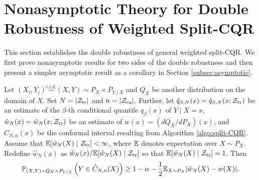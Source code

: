 \section{Nonasymptotic Theory for Double Robustness of Weighted Split-CQR}\label{app:proofs}
This section establishes the double robustness of general weighted
split-CQR. We first prove nonasymptotic results for two sides of the double robustness and then present a simpler asymptotic result as a corollary in Section \ref{subsec:asymptotic}.

\begin{theorem}\label{thm:double_robustness_w}
  Let
  $(X_{i}, Y_{i})\stackrel{i.i.d.}{\sim}(X, Y) \sim P_{X}\times
  P_{Y\mid X}$ and $Q_{X}$ be another distribution on the domain of
  $X$. Set $N = |\mathcal{Z}_{\mathrm{tr}}|$ and $n = |\mathcal{Z}_{\mathrm{ca}}|$. Further, let
  $\hat{q}_{\beta, N}(x) = \hat{q}_{\beta, N}(x; \mathcal{Z}_{\mathrm{tr}})$ be an
  estimate of the $\beta$-th conditional quantile $q_{\beta}(x)$ of
  $Y \mid X = x$, $\hat{w}_{N}(x) = \hat{w}_{N}(x; \mathcal{Z}_{\mathrm{tr}})$ be an
  estimate of $w(x) = (dQ_{X} / dP_{X})(x)$, and $\hat{C}_{N, n}(x)$
  be the conformal interval resulting from Algorithm
  \ref{algo:split-CQR}. Assume that
  $\mathbb{E}[\hat{w}_{N}(X) \mid \mathcal{Z}_{\mathrm{tr}}] < \infty$, where $\mathbb{E}$ denotes
  expectation over $X\sim P_{X}$. Redefine
  $\hat{w}_{N}(x)$ as
  $\hat{w}_{N}(x) / \mathbb{E}[\hat{w}_{N}(X) \mid \mathcal{Z}_{\mathrm{tr}}]$ so that
  $\mathbb{E}[\hat{w}_{N}(X) \mid \mathcal{Z}_{\mathrm{tr}}] = 1$. Then
  \begin{equation}\label{eq:unconditional_coverage_rate_w}
    \mathbb{P}_{(X, Y)\sim Q_{X}\times P_{Y\mid X}}\left( Y\in \hat{C}_{N, n}(X)\right)\ge 1 - \alpha - \frac{1}{2}\mathbb{E}_{X\sim P_{X}}|\hat{w}_{N}(X) - w(X)|.
  \end{equation}

  \end{theorem}

